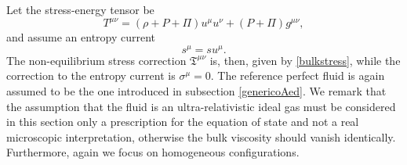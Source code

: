 \documentclass[a4paper, amsfonts, amssymb, amsmath, reprint, showkeys, nofootinbib, twoside]{revtex4-1}
\begin{document}
Let the stress-energy tensor be
\begin{equation}
T^{\mu \nu} = (\rho + P+\Pi)u^\mu u^\nu + (P+\Pi)g^{\mu \nu},
\end{equation}
and assume an entropy current
\begin{equation}
s^\mu = s u^\mu.
\end{equation}
The non-equilibrium stress correction $\mathfrak{T}^{\mu \nu}$ is, then, given by \eqref{bulkstress}, while the correction to the entropy current is $\sigma^\mu =0$. The reference perfect fluid is again assumed to be the one introduced in subsection \ref{genericoAed}.
We remark that the assumption that the fluid is an ultra-relativistic ideal gas must be considered in this section only a prescription for the equation of state and not a real microscopic interpretation, otherwise the bulk viscosity should vanish identically. Furthermore, again we focus on homogeneous configurations.
\end{document}
